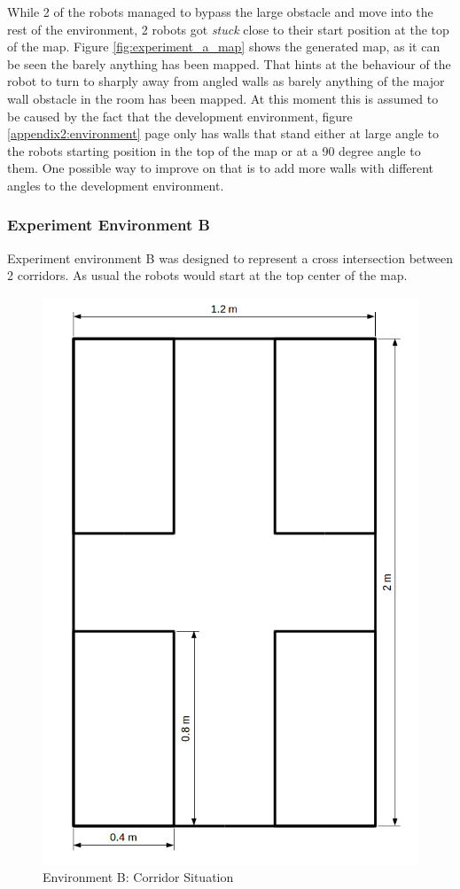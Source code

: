 While 2 of the robots managed to bypass the large obstacle and move into the rest of the environment, 2 robots got \textit{stuck} close to their start position at the top of the map. 
Figure \ref{fig:experiment_a_map} shows the generated map, as it can be seen the barely anything has been mapped. That hints at the behaviour of the robot to turn to sharply away from angled walls as barely anything of the major wall obstacle in the room has been mapped. 
At this moment this is assumed to be caused by the fact that the development environment, figure \ref{appendix2:environment} page \pageref{appendix2:environment} only has walls that stand either at large angle to the robots starting position in the top of the map or at a 90 degree angle to them.
One possible way to improve on that is to add more walls with different angles to the development environment. 

\subsubsection{Experiment Environment B}
Experiment environment B was designed to represent a cross intersection between 2 corridors. As usual the robots would start at the top center of the map. 

\begin{figure}[h]
\centering
\includegraphics[scale=0.4]{Chapter4/images/experiment_2.png}
\caption{Environment B: Corridor Situation}
\label{fig:experiment_b}
\end{figure}

